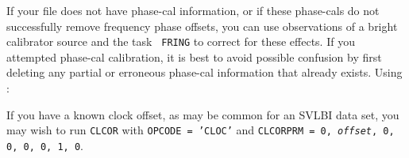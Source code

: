 \vfill\eject
{}

     If your file does not have phase-cal information, or if these
phase-cals do not successfully remove frequency phase offsets, you can
use observations of a bright calibrator source and the task {\tt
FRING} to correct for these effects.  If you attempted phase-cal
calibration, it is best to avoid possible confusion by first deleting
any partial or erroneous phase-cal information that already exists.
Using {\tt {}}:

If you have a known clock offset, as may be common for an SVLBI data
set, you may wish to run {\tt CLCOR} with {\tt OPCODE = 'CLOC'} and
{\tt CLCORPRM = 0, {\it offset\/}, 0, 0, 0, 0, 1, 0}.

